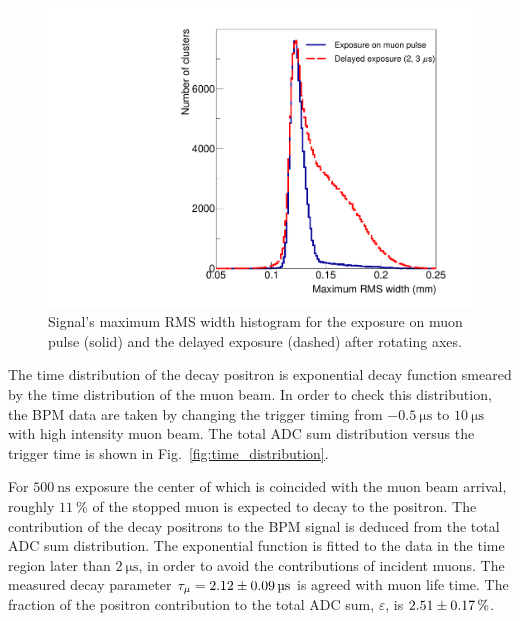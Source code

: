 \documentclass[preprint,3p,twocolumn]{elsarticle}
\begin{document}
\begin{figure}[tbp]
	\centering
	\includegraphics[width=\columnwidth]{figure/RMS_legend_v2.pdf}
	\caption{Signal's maximum RMS width histogram for the exposure on muon pulse (solid) and the delayed exposure (dashed) after rotating axes.}
	\label{fig:positron_width}
\end{figure}
The time distribution of the decay positron is exponential decay function smeared by the time distribution of the muon beam. In order to check this distribution, the BPM data are taken by changing the trigger timing from $\SI{-0.5}{\micro\s}$ to $\SI{10}{\micro\s}$ with high intensity muon beam. The total ADC sum distribution versus the trigger time is shown in Fig.~\ref{fig:time_distribution}.

For $\SI{500}{\nano\s}$ exposure the center of which is coincided with the muon beam arrival, roughly $\SI{11}{\percent}$ of the stopped muon is expected to decay to the positron. The contribution of the decay positrons to the BPM signal is deduced from the total ADC sum distribution. The exponential function is fitted to the data in the time region later than $\SI{2}{\micro\s}$, in order to avoid the contributions of incident muons. The measured decay parameter $\tau_{\mu}=\SI{2.12 \pm 0.09}{\micro\s}$ is agreed with muon life time. The fraction of the positron contribution to the total ADC sum, $\varepsilon$, is $\SI{2.51\pm0.17}{\percent}$.
\end{document}
